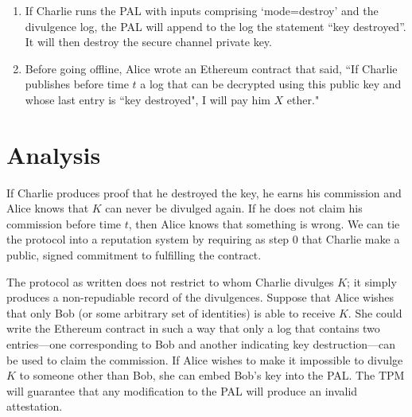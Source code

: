 \documentclass{article}
\begin{document}
\begin{enumerate}
\item If Charlie runs the PAL with inputs comprising `mode=destroy' and the divulgence log, the PAL will append to the log the statement ``key destroyed''. It will then destroy the secure channel private key.

\item Before going offline, Alice wrote an Ethereum contract that said, ``If Charlie publishes before time $t$ a log that can be decrypted using this public key and whose last entry is ``key destroyed", I will pay him $X$ ether."

\end{enumerate}

\section{Analysis}

If Charlie produces proof that he destroyed the key, he earns his commission and Alice knows that $K$ can never be divulged again. If he does not claim his commission before time $t$, then Alice knows that something is wrong. We can tie the protocol into a reputation system by requiring as step 0 that Charlie make a public, signed commitment to fulfilling the contract.

The protocol as written does not restrict to whom Charlie divulges $K$; it simply produces a non-repudiable record of the divulgences. Suppose that Alice wishes that only Bob (or some arbitrary set of identities) is able to receive $K$. She could write the Ethereum contract in such a way that only a log that contains two entries---one corresponding to Bob and another indicating key destruction---can be used to claim the commission. If Alice wishes to make it impossible to divulge $K$ to someone other than Bob, she can embed Bob's key into the PAL. The TPM will guarantee that any modification to the PAL will produce an invalid attestation.



\end{document}
